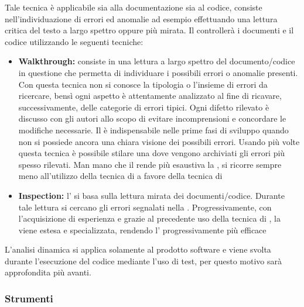 \documentclass[12pt,a4paper]{article}
\begin{document}
Tale tecnica è applicabile sia alla documentazione sia al codice, consiste nell'individuazione di errori ed anomalie ad esempio effettuando una lettura critica del testo a largo spettro oppure più mirata. Il \VR{} controllerà i documenti e il codice utilizzando le seguenti tecniche:
\begin{itemize}
	\item \textbf{Walkthrough:} consiste in una lettura a largo spettro del documento/codice in questione che permetta di individuare i possibili errori o anomalie presenti. Con questa tecnica non si conosce la tipologia o l'insieme di errori da ricercare, bensì ogni aspetto è attentamente analizzato al fine di ricavare, successivamente, delle categorie di errori tipici. Ogni difetto rilevato è discusso con gli autori allo scopo di evitare incomprensioni e concordare le modifiche necessarie. Il  è indispensabile nelle prime fasi di sviluppo quando non si possiede ancora una chiara visione dei possibili errori. Usando più volte questa tecnica è possibile stilare una  dove vengono archiviati gli errori più spesso rilevati. Man mano che il \VR{} rende più esaustiva la , si ricorre sempre meno all'utilizzo della tecnica di  a favore della tecnica di 
	\item \textbf{Inspection:} l' si basa sulla lettura mirata dei documenti/codice. Durante tale lettura si cercano gli errori segnalati nella . Progressivamente, con l'acquisizione di esperienza e grazie al precedente uso della tecnica di , la  viene estesa e specializzata, rendendo l' progressivamente più efficace
\end{itemize}

L’analisi dinamica si applica solamente al prodotto software e viene svolta durante l’esecuzione del codice mediante l’uso di test, per questo motivo sarà approfondita più avanti.

\subsubsection{Strumenti}
\end{document}
